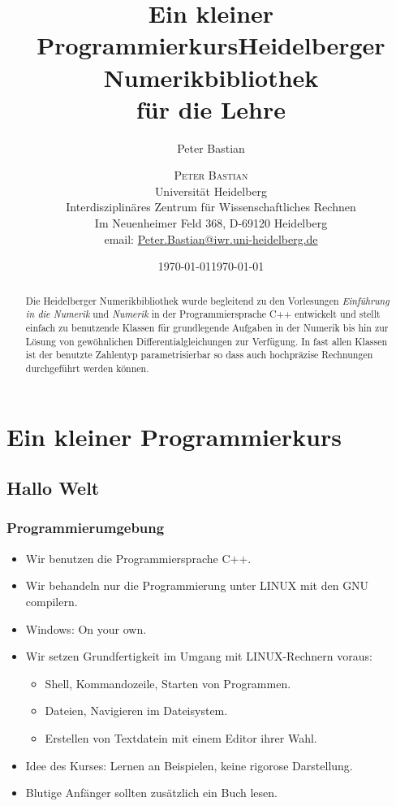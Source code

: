 \documentclass[ignorenonframetext,12pt]{beamer}
\title{Ein kleiner Programmierkurs}
\author{Peter Bastian}
\institute[IWR]
  {
    Universität Heidelberg\\
    Interdisziplinäres Zentrum für Wissenschaftliches Rechnen\\
    Im Neuenheimer Feld 368, D-69120 Heidelberg\\
	email: \url{Peter.Bastian@iwr.uni-heidelberg.de}
  }
\date{\today}
\title{Heidelberger Numerikbibliothek \\ für die Lehre}
\author{\textsc{Peter Bastian}\\
    Universität Heidelberg\\
    Interdisziplinäres Zentrum für Wissenschaftliches Rechnen\\
    Im Neuenheimer Feld 368, D-69120 Heidelberg\\
	email: \url{Peter.Bastian@iwr.uni-heidelberg.de}
  }
\date{\today}
\theoremstyle{definition}
\theoremstyle{definition}
\begin{document}
\nocite{*}
{
  \begin{frame}
    \titlepage
  \end{frame}
}
{
\maketitle
}

\begin{abstract}
Die Heidelberger Numerikbibliothek wurde begleitend zu den Vorlesungen
\textit{Einführung in die Numerik} und \textit{Numerik} in der Programmiersprache C++
entwickelt und stellt
einfach zu benutzende Klassen für grundlegende Aufgaben in der Numerik bis hin zur Lösung
von gewöhnlichen Differentialgleichungen zur Verfügung. In fast allen Klassen ist der
benutzte Zahlentyp parametrisierbar so dass auch hochpräzise Rechnungen durchgeführt werden können.
\end{abstract}




\section{Ein kleiner Programmierkurs}

\subsection{Hallo Welt}

\begin{frame}[fragile]
\frametitle{Programmierumgebung}
\begin{itemize}
\item Wir benutzen die Programmiersprache C++.
\item Wir behandeln nur die Programmierung unter LINUX mit den GNU
  compilern.
\item Windows: On your own.
\item Wir setzen Grundfertigkeit im Umgang mit LINUX-Rechnern voraus:
\begin{itemize}
\item Shell, Kommandozeile, Starten von Programmen.
\item Dateien, Navigieren im Dateisystem.
\item Erstellen von Textdatein mit einem Editor ihrer Wahl.
\end{itemize}
\item Idee des Kurses: \glqq{}Lernen an Beispielen\grqq{}, keine
  rigorose Darstellung.
\item Blutige Anfänger sollten zusätzlich ein Buch lesen.
\end{itemize}
\end{frame}
\end{document}
